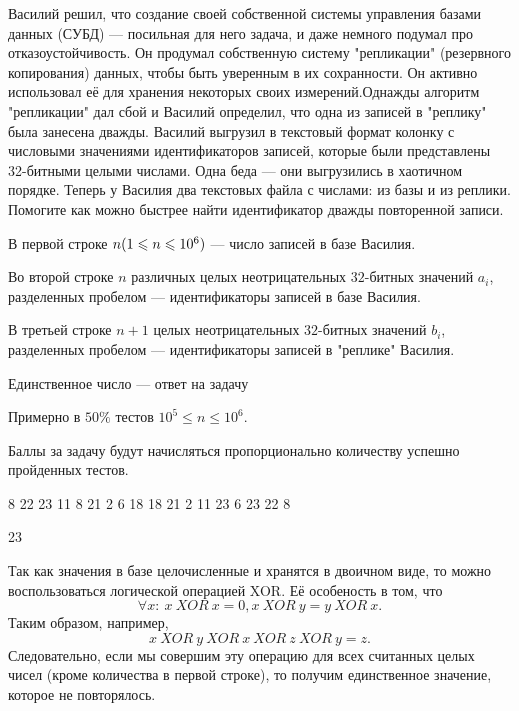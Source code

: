 
Василий решил, что создание своей собственной системы управления базами данных (СУБД) — посильная для него задача, и даже немного подумал про отказоустойчивость. Он продумал собственную систему "репликации" (резервного копирования) данных, чтобы быть уверенным в их сохранности. Он активно использовал её для хранения некоторых своих измерений.Однажды алгоритм "репликации" дал сбой и Василий определил, что одна из записей в "реплику" была занесена дважды. Василий выгрузил в текстовый формат колонку с числовыми значениями идентификаторов записей, которые были представлены 32-битными целыми числами. Одна беда — они выгрузились в хаотичном порядке. Теперь у Василия два текстовых файла с числами: из базы и из реплики. Помогите как можно быстрее найти идентификатор дважды повторенной записи.


В первой строке $ n\space (1\leq n \leq 10^6) $ — число записей в базе Василия.

Во второй строке $ n $ различных целых неотрицательных $ 32 $-битных значений $ a_i $, разделенных пробелом — идентификаторы записей в базе Василия.

В третьей строке $ n+1 $ целых неотрицательных $ 32 $-битных значений $ b_i $, разделенных пробелом — идентификаторы записей в "реплике" Василия. 

\outputfmtSection

Единственное число — ответ на задачу

\markSection

Примерно в $ 50\% $ тестов $ 10^5\leq n \leq 10^6 $.

Баллы за задачу будут начисляться пропорционально количеству успешно пройденных тестов.


\begin{myverbbox}[\small]{\vinput}
    8
    22 23 11 8 21 2 6 18
    18 21 2 11 23 6 23 22 8
\end{myverbbox}

\begin{myverbbox}[\small]{\voutput}
    23
\end{myverbbox}

\solutionSection
Так как значения в базе целочисленные и хранятся в двоичном виде, то можно воспользоваться логической 
операцией XOR. Её особеность в том, что $$\forall x: \: x \: XOR \: x = 0, x \: XOR \: y = y \: XOR \: x.$$ Таким образом, например, $$x \: XOR \: y \: XOR \: x \: XOR \: z \: XOR \: y = z.$$ Следовательно, если мы совершим эту операцию для всех считанных целых чисел (кроме количества в первой строке), то получим единственное значение, которое не повторялось.

